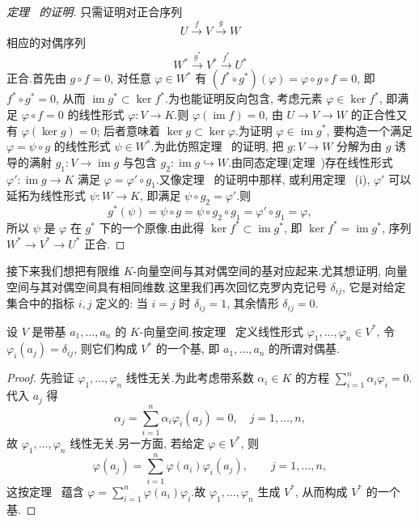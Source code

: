 \begin{proof}[定理~ 的证明]
只需证明对正合序列
\[
U \xrightarrow{f} V \xrightarrow{g} W
\]
相应的对偶序列
\[
W^* \xrightarrow{g^*} V^* \xrightarrow{f^*} U^*
\]
正合.首先由 $g \circ f = 0$, 对任意 $\varphi \in W^*$ 有 $(f^* \circ g^*)(\varphi) = \varphi \circ g \circ f = 0$, 即 $f^* \circ g^* = 0$, 从而 $\operatorname{im} g^* \subset \ker f^*$.为也能证明反向包含, 考虑元素 $\varphi \in \ker f^*$, 即满足 $\varphi \circ f = 0$ 的线性形式 $\varphi \colon V \longrightarrow K$.则 $\varphi(\operatorname{im} f) = 0$, 由 $U \longrightarrow V \longrightarrow W$ 的正合性又有 $\varphi(\ker g) = 0$; 后者意味着 $\ker g \subset \ker \varphi$.为证明 $\varphi \in \operatorname{im} g^*$, 要构造一个满足 $\varphi = \psi \circ g$ 的线性形式 $\psi \in W^*$.为此仿照定理~ 的证明, 把 $g \colon V \longrightarrow W$ 分解为由 $g$ 诱导的满射 $g_1 \colon V \longrightarrow \operatorname{im} g$ 与包含 $g_2 \colon \operatorname{im} g \hookrightarrow W$.由同态定理(定理~)存在线性形式 $\varphi' \colon \operatorname{im} g \longrightarrow K$ 满足 $\varphi = \varphi' \circ g_1$.又像定理~ 的证明中那样, 或利用定理~ (i), $\varphi'$ 可以延拓为线性形式 $\psi \colon W \longrightarrow K$, 即满足 $\psi \circ g_2 = \varphi'$.则
\[
g^*(\psi) = \psi \circ g = \psi \circ g_2 \circ g_1 = \varphi' \circ g_1 = \varphi,
\]
所以 $\psi$ 是 $\varphi$ 在 $g^*$ 下的一个原像.由此得 $\ker f^* \subset \operatorname{im} g^*$, 即 $\ker f^* = \operatorname{im} g^*$, 序列 $W^* \longrightarrow V^* \longrightarrow U^*$ 正合.
\end{proof}

接下来我们想把有限维 $K$-向量空间与其对偶空间的基对应起来.尤其想证明, 向量空间与其对偶空间具有相同维数.这里我们再次回忆克罗内克记号 $\delta_{ij}$, 它是对给定集合中的指标 $i, j$ 定义的: 当 $i = j$ 时 $\delta_{ij} = 1$, 其余情形 $\delta_{ij} = 0$.

\begin{theorem}\label{thm:2.3.5}
设 $V$ 是带基 $a_1, \ldots, a_n$ 的 $K$-向量空间.按定理~ 定义线性形式 $\varphi_1, \ldots, \varphi_n \in V^*$, 令 $\varphi_i(a_j) = \delta_{ij}$, 则它们构成 $V^*$ 的一个基, 即 $a_1, \ldots, a_n$ 的所谓对偶基.
\end{theorem}

\begin{proof}
先验证 $\varphi_1, \ldots, \varphi_n$ 线性无关.为此考虑带系数 $\alpha_i \in K$ 的方程 $\sum_{i = 1}^{n} \alpha_i \varphi_i = 0$.代入 $a_j$ 得
\[
\alpha_j = \sum_{i = 1}^{n} \alpha_i \varphi_i(a_j) = 0, \quad j = 1, \ldots, n,
\]
故 $\varphi_1, \ldots, \varphi_n$ 线性无关.另一方面, 若给定 $\varphi \in V^*$, 则
\[
\varphi(a_j) = \sum_{i = 1}^{n} \varphi(a_i)\varphi_i(a_j), \qquad j = 1, \ldots, n,
\]
这按定理~ 蕴含 $\varphi = \sum_{i = 1}^{n} \varphi(a_i)\varphi_i$.故 $\varphi_1, \ldots, \varphi_n$ 生成 $V^*$, 从而构成 $V^*$ 的一个基.
\end{proof}

